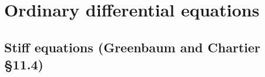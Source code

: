 \documentclass[12pt,letterpaper,noanswers]{exam}
\begin{document}
\section*{Ordinary differential equations}


\subsection*{Stiff equations (Greenbaum and Chartier \S 11.4)}




\end{document}

